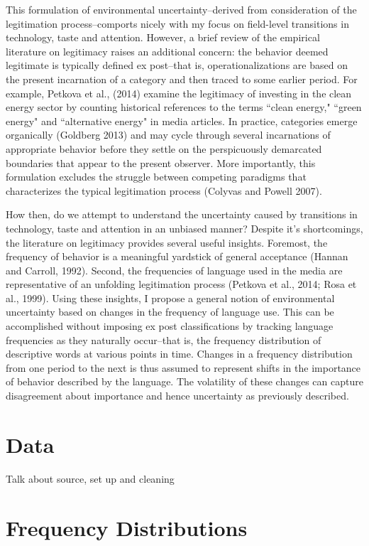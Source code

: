 This formulation of environmental uncertainty--derived from consideration of the legitimation process--comports nicely with my focus on field-level transitions in technology, taste and attention. However, a brief review of the empirical literature on legitimacy raises an additional concern: the behavior deemed legitimate is typically defined ex post--that is, operationalizations are based on the present incarnation of a category and then traced to some earlier period. For example, Petkova et al., (2014) examine the legitimacy of investing in the clean energy sector by counting historical references to the terms ``clean energy," ``green energy" and ``alternative energy" in media articles. In practice, categories emerge organically (Goldberg 2013) and may cycle through several incarnations of appropriate behavior before they settle on the perspicuously demarcated boundaries that appear to the present observer. More importantly, this formulation excludes the struggle between competing paradigms that characterizes the typical legitimation process (Colyvas and Powell 2007).

How then, do we attempt to understand the uncertainty caused by transitions in technology, taste and attention in an unbiased manner? Despite it's shortcomings, the literature on legitimacy provides several useful insights. Foremost, the frequency of  behavior is a meaningful yardstick of general acceptance (Hannan and Carroll, 1992). Second, the frequencies of language used in the media are representative of an unfolding legitimation process (Petkova et al., 2014; Rosa et al., 1999). Using these insights, I propose a general notion of environmental uncertainty based on changes in the frequency of language use. This can be accomplished without imposing ex post classifications by tracking language frequencies as they naturally occur--that is, the frequency distribution of descriptive words at various points in time. Changes in a frequency distribution from one period to the next is thus assumed to represent shifts in the importance of behavior described by the language. The volatility of these changes can capture disagreement about importance and hence uncertainty as previously described. 

\section{Data}

Talk about source, set up and cleaning

\section{Frequency Distributions}

